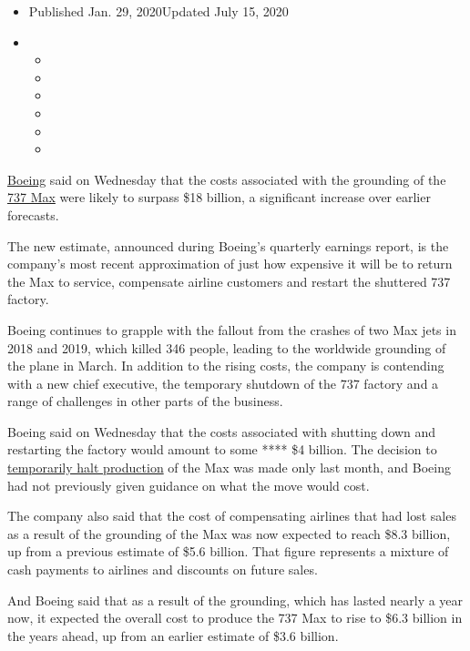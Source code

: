 \begin{itemize}
\item
  Published Jan. 29, 2020Updated July 15, 2020
\item
  \begin{itemize}
  \item
  \item
  \item
  \item
  \item
  \item
  \end{itemize}
\end{itemize}

\href{https://www.nytimes3xbfgragh.onion/2020/01/22/business/trump-boeing-davos-737-max.html?searchResultPosition=2}{Boeing}
said on Wednesday that the costs associated with the grounding of the
\href{https://www.nytimes3xbfgragh.onion/2020/07/15/business/boeing-737-max-return.html}{737
Max} were likely to surpass \$18 billion, a significant increase over
earlier forecasts.

The new estimate, announced during Boeing's quarterly earnings report,
is the company's most recent approximation of just how expensive it will
be to return the Max to service, compensate airline customers and
restart the shuttered 737 factory.

Boeing continues to grapple with the fallout from the crashes of two Max
jets in 2018 and 2019, which killed 346 people, leading to the worldwide
grounding of the plane in March. In addition to the rising costs, the
company is contending with a new chief executive, the temporary shutdown
of the 737 factory and a range of challenges in other parts of the
business.

Boeing said on Wednesday that the costs associated with shutting down
and restarting the factory would amount to some **** \$4 billion. The
decision to
\href{https://www.nytimes3xbfgragh.onion/2019/12/16/business/boeing-737-max.html}{temporarily
halt production} of the Max was made only last month, and Boeing had not
previously given guidance on what the move would cost.

The company also said that the cost of compensating airlines that had
lost sales as a result of the grounding of the Max was now expected to
reach \$8.3 billion, up from a previous estimate of \$5.6 billion. That
figure represents a mixture of cash payments to airlines and discounts
on future sales.

And Boeing said that as a result of the grounding, which has lasted
nearly a year now, it expected the overall cost to produce the 737 Max
to rise to \$6.3 billion in the years ahead, up from an earlier estimate
of \$3.6 billion.

